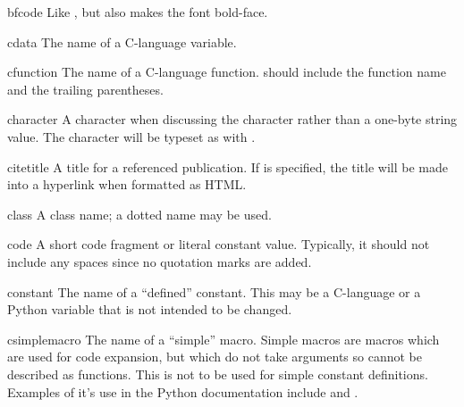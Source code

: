 \documentclass{howto}
\begin{document}
    \begin{macrodesc}{bfcode}{}
      Like , but also makes the font bold-face.
    \end{macrodesc}

    \begin{macrodesc}{cdata}{}
      The name of a C-language variable.
    \end{macrodesc}

    \begin{macrodesc}{cfunction}{}
      The name of a C-language function.   should include the
      function name and the trailing parentheses.
    \end{macrodesc}

    \begin{macrodesc}{character}{}
      A character when discussing the character rather than a one-byte
      string value.  The character will be typeset as with .
    \end{macrodesc}

    \begin{macrodesc}{citetitle}{}
      A title for a referenced publication.  If  is specified,
      the title will be made into a hyperlink when formatted as HTML.
    \end{macrodesc}

    \begin{macrodesc}{class}{}
      A class name; a dotted name may be used.
    \end{macrodesc}

    \begin{macrodesc}{code}{}
      A short code fragment or literal constant value.  Typically, it
      should not include any spaces since no quotation marks are
      added.
    \end{macrodesc}

    \begin{macrodesc}{constant}{}
      The name of a ``defined'' constant.  This may be a C-language
       or a Python variable that is not intended to be
      changed.
    \end{macrodesc}

    \begin{macrodesc}{csimplemacro}{}
      The name of a ``simple'' macro.  Simple macros are macros
      which are used for code expansion, but which do not take
      arguments so cannot be described as functions.  This is not to
      be used for simple constant definitions.  Examples of it's use
      in the Python documentation include
       and
      .
    \end{macrodesc}
\end{document}
